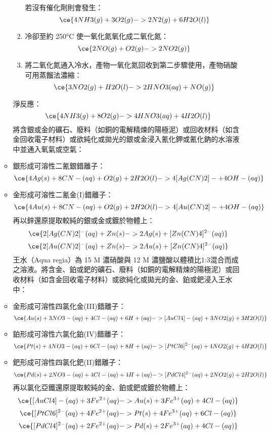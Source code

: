 \documentclass[a4paper,12pt]{report}
\begin{document}
\begin{itemize}
\begin{itemize}
\begin{enumerate}
若沒有催化劑則會發生：
\[\ce{4NH3(g) + 3O2(g) -> 2N2(g) + 6H2O(l)}\]
\item 冷卻至約 250°C 使一氧化氮氧化成二氧化氮：
\[\ce{2NO(g) + O2(g) -> 2NO2(g)}\]
\item 將二氧化氮通入冷水，產物一氧化氮回收到第二步驟使用，產物硝酸可用蒸餾法濃縮：
\[\ce{3NO2(g) + H2O(l) -> 2HNO3(aq) + NO(g)}\]
\end{enumerate}
淨反應：
\[\ce{4NH3(g) + 8O2(g) -> 4HNO3(aq) + 4H2O(l)}\]
將含銀或金的礦石、廢料（如銅的電解精煉的陽極泥）或回收材料（如含金回收電子材料）或欲純化或拋光的銀或金浸入氰化鉀或氰化鈉的水溶液中並通入氧氣或空氣：
\bit
\item 銀形成可溶性二氰銀錯離子\ce{[Ag(CN)2]-}：
\[\ce{4Ag(s) + 8CN-(aq) + O2(g) + 2H2O(l) -> 4[Ag(CN)2]- + 4OH-(aq)}\]
\item 金形成可溶性二氰金(I)錯離子\ce{[Au(CN)2]-}：
\[\ce{4Au(s) + 8CN-(aq) + O2(g) + 2H2O(l) -> 4[Au(CN)2]- + 4OH-(aq)}\]
\eit
再以鋅還原提取較純的銀或金或鍍於物體上：
\[\ce{2[Ag(CN)2]^-(aq) + Zn(s) -> 2Ag(s) + [Zn(CN)4]^{2-}(aq)}\]
\[\ce{2[Au(CN)2]^-(aq) + Zn(s) -> 2Au(s) + [Zn(CN)4]^{2-}(aq)}\]
王水（Aqua regia）為 15 M 濃硝酸與 12 M 濃鹽酸以體積比1:3混合而成之溶液。將含金、鉑或鈀的礦石、廢料（如銅的電解精煉的陽極泥）或回收材料（如含金回收電子材料）或欲純化或拋光的金、鉑或鈀浸入王水中：
\bit
\item 金形成可溶性四氯化金(III)錯離子\ce{[AuCl4]-}：
\[\ce{Au(s) + 3NO3-(aq) + 4Cl-(aq) + 6H+(aq) -> [AuCl4]-(aq) + 3NO2(g) + 3H2O(l)}\]
\item 鉑形成可溶性六氯化鉑(IV)錯離子：
\[\ce{Pt(s) + 4NO3-(aq) + 6Cl-(aq) + 8H+(aq) -> [PtCl6]^{2-}(aq) + 4NO2(g) + 4H2O(l)}\]
\item 鈀形成可溶性四氯化鈀(II)錯離子：
\[\ce{Pd(s) + 2NO3-(aq) + 4Cl-(aq) + 4H+(aq) -> [PdCl4]^{2-}(aq) + 2NO2(g) + 2H2O(l)}\]
\eit
再以氯化亞鐵還原提取較純的金、鉑或鈀或鍍於物體上：
\[\ce{[AuCl4]-(aq) + 3Fe^{2+}(aq) -> Au(s) + 3Fe^{3+}(aq) + 4Cl-(aq)}\]
\[\ce{[PtCl6]^{2-}(aq) + 4Fe^{2+}(aq) -> Pt(s) + 4Fe^{3+}(aq) + 6Cl-(aq)}\]
\[\ce{[PdCl4]^{2-}(aq) + 2Fe^{2+}(aq) -> Pd(s) + 2Fe^{3+}(aq) + 4Cl-(aq)}\]

\end{itemize}
\end{itemize}
\end{document}
